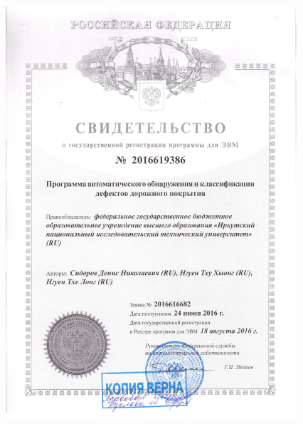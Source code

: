 \begin{figure}[ht!]
\centering
\includegraphics [width=1\linewidth] {images/p25.png}\label{imgp25}
\end{figure}

